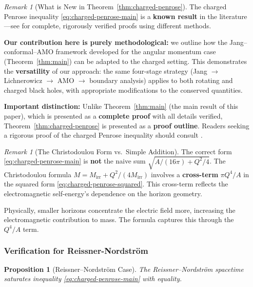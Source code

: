 \documentclass[12pt]{article}
\theoremstyle{plain}
\newtheorem{proposition}[theorem]{Proposition}
\theoremstyle{definition}
\theoremstyle{remark}
\newtheorem{remark}[theorem]{Remark}
\begin{document}
\begin{remark}[What is New in Theorem~\ref{thm:charged-penrose}]\label{rem:charged-novelty}
The charged Penrose inequality \eqref{eq:charged-penrose-main} is a \textbf{known result} in the literature---see \cite{mars2009, khuri2015charged} for complete, rigorously verified proofs using different methods. 

\textbf{Our contribution here is purely methodological:} we outline how the Jang--conformal--AMO framework developed for the angular momentum case (Theorem~\ref{thm:main}) can be adapted to the charged setting. This demonstrates the \textbf{versatility} of our approach: the same four-stage strategy (Jang $\to$ Lichnerowicz $\to$ AMO $\to$ boundary analysis) applies to both rotating and charged black holes, with appropriate modifications to the conserved quantities.

\textbf{Important distinction:} Unlike Theorem~\ref{thm:main} (the main result of this paper), which is presented as a \textbf{complete proof} with all details verified, Theorem~\ref{thm:charged-penrose} is presented as a \textbf{proof outline}. Readers seeking a rigorous proof of the charged Penrose inequality should consult \cite{mars2009, khuri2015charged}.
\end{remark}

\begin{remark}[The Christodoulou Form vs.\ Simple Addition]
The correct form \eqref{eq:charged-penrose-main} is \textbf{not} the naive sum $\sqrt{A/(16\pi) + Q^2/4}$. The Christodoulou formula $M = M_{\mathrm{irr}} + Q^2/(4M_{\mathrm{irr}})$ involves a \textbf{cross-term} $\pi Q^4/A$ in the squared form \eqref{eq:charged-penrose-squared}. This cross-term reflects the electromagnetic self-energy's dependence on the horizon geometry.

Physically, smaller horizons concentrate the electric field more, increasing the electromagnetic contribution to mass. The formula captures this through the $Q^4/A$ term.
\end{remark}

\subsubsection{Verification for Reissner-Nordstr\"om}

\begin{proposition}[Reissner--Nordstr\"om Case]\label{prop:RN-saturation}
The Reissner--Nordstr\"om spacetime saturates inequality \eqref{eq:charged-penrose-main} with equality.
\end{proposition}
\end{document}
